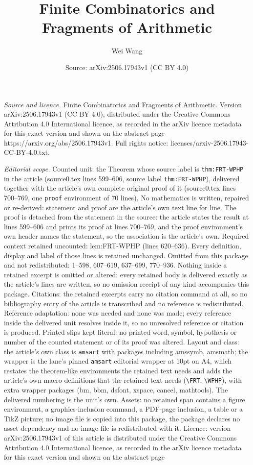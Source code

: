 \documentclass[10pt,a4paper]{amsart}
\title[Finite Combinatorics and Fragments of Arithmetic]{Finite Combinatorics and Fragments of Arithmetic}
\author{Wei Wang}
\date{Source: arXiv:2506.17943v1 (CC BY 4.0)}
\begin{document}
\maketitle

\noindent\emph{Source and licence.} Finite Combinatorics and Fragments of Arithmetic. Version arXiv:2506.17943v1 (CC BY 4.0), distributed under the Creative Commons Attribution 4.0 International licence, as recorded in the arXiv licence metadata for this exact version and shown on the abstract page https://arxiv.org/abs/2506.17943v1. Full rights notice: licenses/arxiv-2506.17943-CC-BY-4.0.txt.\par\smallskip

\noindent\textit{Editorial scope.} Counted unit: the Theorem whose source label is \texttt{thm:FRT-WPHP} in the article (source0.tex lines 599--606, source label \texttt{thm:FRT-WPHP}), delivered together with the article's own complete original proof of it (source0.tex lines 700--769, one \texttt{proof} environment of 70 lines). No mathematics is written, repaired or re-derived: statement and proof are the article's own text line for line. The proof is detached from the statement in the source: the article states the result at lines 599--606 and prints its proof at lines 700--769, and the proof environment's own header names the statement, so the association is the article's own. Required context retained uncounted: lem:FRT-WPHP (lines 620--636). Every definition, display and label of those lines is retained unchanged. Omitted from this package and not redistributed: 1--598, 607--619, 637--699, 770--936. Nothing inside a retained excerpt is omitted or altered: every retained body is delivered exactly as the article's lines are written, so no omission receipt of any kind accompanies this package. Citations: the retained excerpts carry no citation command at all, so no bibliography entry of the article is transcribed and no reference is redistributed. Reference adaptation: none was needed and none was made; every reference inside the delivered unit resolves inside it, so no unresolved reference or citation is produced. Printed slips kept literal: no printed word, symbol, hypothesis or number of the counted statement or of its proof was altered. Layout and class: the article's own class is \texttt{amsart} with packages including amssymb, amsmath; the wrapper is the lane's pinned \texttt{amsart} editorial wrapper at 10pt on A4, which restates the theorem-like environments the retained text needs and adds the article's own macro definitions that the retained text needs (\texttt{\textbackslash FRT}, \texttt{\textbackslash WPHP}), with extra wrapper packages (bm, bbm, dsfont, xspace, cancel, mathtools). The delivered numbering is the unit's own. Assets: no retained span contains a figure environment, a graphics-inclusion command, a PDF-page inclusion, a table or a TikZ picture; no image file is copied into this package, the package declares no asset dependency and no image file is redistributed with it. Licence: version arXiv:2506.17943v1 of this article is distributed under the Creative Commons Attribution 4.0 International licence, as recorded in the arXiv licence metadata for this exact version and shown on the abstract page 
\end{document}
